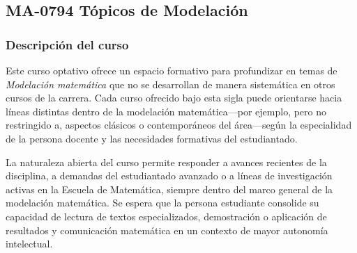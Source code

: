 \newpage
\subsection*{MA-0794 Tópicos de Modelación}

\hypertarget{MA0794}{}
\begin{refsection}
\begin{table}[H]
\end{table}

\subsubsection*{Descripción del curso}

Este curso optativo ofrece un espacio formativo para profundizar en temas de \emph{Modelación matemática} que no se desarrollan de manera sistemática en otros cursos de la carrera. Cada curso ofrecido bajo esta sigla puede orientarse hacia líneas distintas dentro de la modelación matemática---por ejemplo, pero no restringido a, aspectos clásicos o contemporáneos del área---según la especialidad de la persona docente y las necesidades formativas del estudiantado.

La naturaleza abierta del curso permite responder a avances recientes de la disciplina, a demandas del estudiantado avanzado o a líneas de investigación activas en la Escuela de Matemática, siempre dentro del marco general de la modelación matemática. Se espera que la persona estudiante consolide su capacidad de lectura de textos especializados, demostración o aplicación de resultados y comunicación matemática en un contexto de mayor autonomía intelectual.


\end{refsection}

